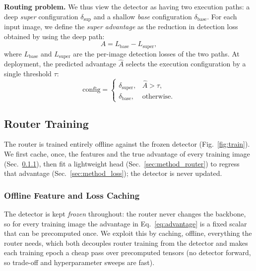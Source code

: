 \medskip
\noindent\textbf{Routing problem.}
We thus view the detector as having two execution paths: a deep \emph{super}
configuration $\delta_{\text{sup}}$ and a shallow \emph{base} configuration
$\delta_{\text{base}}$. For each input image, we define the \emph{super
advantage} as the reduction in detection loss obtained by using the deep path:
\begin{equation}
A = L_{\text{base}} - L_{\text{super}},
\label{eq:advantage}
\end{equation}
where $L_{\text{base}}$ and $L_{\text{super}}$ are the per-image detection
losses of the two paths. At deployment, the predicted advantage $\hat{A}$
selects the execution configuration by a single threshold $\tau$:
\begin{equation}
\text{config} =
\begin{cases}
\delta_{\text{super}}, & \hat{A} > \tau,\\[2pt]
\delta_{\text{base}},  & \text{otherwise.}
\end{cases}
\label{eq:route}
\end{equation}


\subsection{Router Training}
\label{sec:method_training}
The router is trained entirely offline against the frozen detector
(Fig.~\ref{fig:train}). We first cache,
once, the features and the true advantage of every training image
(Sec.~\ref{sec:method_caching}), then fit a lightweight head
(Sec.~\ref{sec:method_router}) to regress that advantage
(Sec.~\ref{sec:method_loss}); the detector is never updated.

\subsubsection{Offline Feature and Loss Caching}
\label{sec:method_caching}
The detector is kept \emph{frozen} throughout: the router never changes the
backbone, so for every training image the advantage in Eq.~\eqref{eq:advantage} is
a fixed scalar that can be precomputed once. We exploit this by caching, offline,
everything the router needs, which both decouples router training from the
detector and makes each training epoch a cheap pass over precomputed tensors (no
detector forward, so trade-off and hyperparameter sweeps are fast).
 
